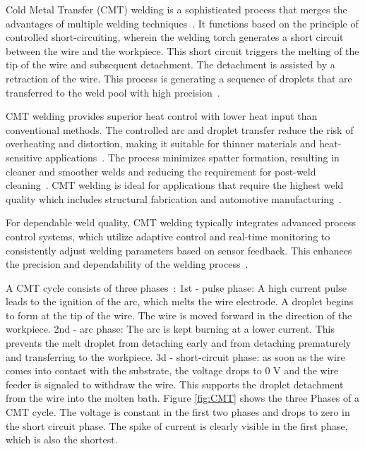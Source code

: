 Cold Metal Transfer (CMT) welding is a sophisticated process that merges the advantages of multiple welding techniques~\cite{Dutra.2015}. It functions based on the principle of controlled short-circuiting, wherein the welding torch generates a short circuit between the wire and the workpiece. This short circuit triggers the melting of the tip of the wire and subsequent detachment. The detachment is assisted by a retraction of the wire. This process is generating a sequence of droplets that are transferred to the weld pool with high precision~\cite{Selvi.2018, Srinivasan.2022}.

CMT welding provides superior heat control with lower heat input than conventional methods. The controlled arc and droplet transfer reduce the risk of overheating and distortion, making it suitable for thinner materials and heat-sensitive applications~\cite{Scotti.2020}. The process minimizes spatter formation, resulting in cleaner and smoother welds and reducing the requirement for post-weld cleaning~\cite{Srinivasan.2022}. %
CMT welding is ideal for applications that require the highest weld quality which includes structural fabrication and automotive manufacturing~\cite{Cong.2016}.

For dependable weld quality, CMT welding typically integrates advanced process control systems, which utilize adaptive control and real-time monitoring to consistently adjust welding parameters based on sensor feedback. This enhances the precision and dependability of the welding process~\cite{Pickin.2006}.

A CMT cycle consists of three phases~\cite{Selvi.2018}:\newline
1st - pulse phase: A high current pulse leads to the ignition of the arc, 
which melts the wire electrode. A droplet begins to form at the 
tip of the wire. The wire is moved forward in the direction of the 
workpiece.\newline
2nd - arc phase: The arc is kept burning at a lower current. This prevents the melt droplet from detaching early and 
from detaching prematurely and transferring to the workpiece.\newline
3d - short-circuit phase: as soon as the wire comes into contact with the substrate, 
the voltage drops to 0 V and the wire feeder is signaled to withdraw the wire. This supports the droplet detachment 
from the wire into the molten bath.
\newpage
Figure \ref{fig:CMT} shows the three Phases of a CMT cycle. The voltage is constant in the first two phases and drops to zero in the short circuit phase. The spike of current is clearly visible in the first phase, which is also the shortest.

